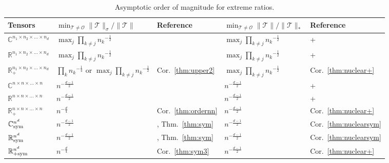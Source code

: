 \documentclass[11pt]{article}
\newcommand{\C}{\mathbb{C}}
\newcommand{\R}{\mathbb{R}}
\newcommand{\OO}{\mathcal{O}}
\newcommand{\TT}{\mathcal{T}}
\newcommand{\sym}{\textnormal{sym}}
\begin{document}
\begin{table}[ht]
    \centering
    \begin{tabular}{|l|l|l|l|l|}
    \hline
    Tensors & $\min_{\TT\neq\OO}\|\TT\|_\sigma/\|\TT\|$ & Reference & $\min_{\TT\neq\OO}\|\TT\|/\|\TT\|_*$ & Reference
\\\hline
    $\C^{n_1\times n_2\times \dots\times n_d}$ & $\max_{j}\prod_{k\neq j}{n_k}^{-\frac{1}{2}}$ & \cite{KT22} & $\max_{j}\prod_{k\neq j}{n_k}^{-\frac{1}{2}}$  & \cite{KT22}+\cite{DFLW17}
\\
    $\R^{n_1\times n_2\times \dots\times n_d}$   & $\max_{j}\prod_{k\neq j}{n_k}^{-\frac{1}{2}}$ & \cite{LNSU18} & $\max_{j}\prod_{k\neq j}{n_k}^{-\frac{1}{2}}$  & \cite{LNSU18}+\cite{DFLW17}
\\
    $\R^{n_1\times n_2\times \dots\times n_d}_+$  & $\prod_{k}{n_k}^{-\frac{1}{4}}$ or $\max_{j}\prod_{k\neq j}{n_k}^{-\frac{1}{2}}$ & Cor.~\ref{thm:upper2}  & $\max_{j}\prod_{k\neq j}{n_k}^{-\frac{1}{2}}$  & Cor.~\ref{thm:nuclear+}
\\\hline
    $\C^{n\times n\times \dots\times n}$ & $n^{-\frac{d-1}{2}}$ & \cite{KT22} & $n^{-\frac{d-1}{2}}$  & \cite{KT22}+\cite{DFLW17}
\\
    $\R^{n\times n\times \dots\times n}$   & $n^{-\frac{d-1}{2}}$ & \cite{CKP99} & $n^{-\frac{d-1}{2}}$ & \cite{CKP99}+\cite{DFLW17}
\\
    $\R^{n\times n\times \dots\times n}_+$   & $n^{-\frac{d}{4}}$ & Cor.~\ref{thm:ordernn} & $n^{-\frac{d-1}{2}}$  & Cor.~\ref{thm:nuclear+}
\\\hline
    $\C^{n^d}_\sym$   & $n^{-\frac{d-1}{2}}$ &  \cite{KT22}, Thm.~\ref{thm:sym} & $n^{-\frac{d-1}{2}}$  & Cor.~\ref{thm:nuclearsym}
\\
    $\R^{n^d}_\sym$ & $n^{-\frac{d-1}{2}}$ & \cite{KT22}, Thm.~\ref{thm:sym} & $n^{-\frac{d-1}{2}}$ & Cor.~\ref{thm:nuclearsym}
\\
    $\R^{n^d}_{+\sym}$ & $n^{-\frac{d}{4}}$ & Cor.~\ref{thm:sym3} & $n^{-\frac{d-1}{2}}$  & Cor.~\ref{thm:nuclear+}
\\\hline
\end{tabular}
\caption{Asymptotic order of magnitude for extreme ratios.} \label{table:list}
\end{table}
\end{document}

